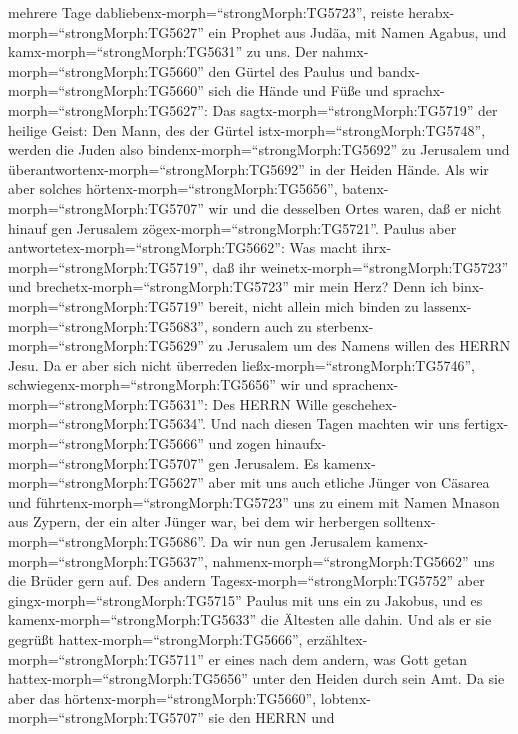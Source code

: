 mehrere Tage dabliebenx-morph=``strongMorph:TG5723'', reiste
herabx-morph=``strongMorph:TG5627'' ein Prophet aus Judäa, mit Namen
Agabus, und kamx-morph=``strongMorph:TG5631'' zu uns.  Der
nahmx-morph=``strongMorph:TG5660'' den Gürtel des Paulus und
bandx-morph=``strongMorph:TG5660'' sich die Hände und Füße und
sprachx-morph=``strongMorph:TG5627'': Das
sagtx-morph=``strongMorph:TG5719'' der heilige Geist: Den Mann, des der
Gürtel istx-morph=``strongMorph:TG5748'', werden die Juden also
bindenx-morph=``strongMorph:TG5692'' zu Jerusalem und
überantwortenx-morph=``strongMorph:TG5692'' in der Heiden Hände.
 Als wir aber solches hörtenx-morph=``strongMorph:TG5656'',
batenx-morph=``strongMorph:TG5707'' wir und die desselben Ortes waren,
daß er nicht hinauf gen Jerusalem zögex-morph=``strongMorph:TG5721''.
 Paulus aber antwortetex-morph=``strongMorph:TG5662'': Was
macht ihrx-morph=``strongMorph:TG5719'', daß ihr
weinetx-morph=``strongMorph:TG5723'' und
brechetx-morph=``strongMorph:TG5723'' mir mein Herz? Denn ich
binx-morph=``strongMorph:TG5719'' bereit, nicht allein mich binden zu
lassenx-morph=``strongMorph:TG5683'', sondern auch zu
sterbenx-morph=``strongMorph:TG5629'' zu Jerusalem um des Namens willen
des HERRN Jesu.  Da er aber sich nicht überreden
ließx-morph=``strongMorph:TG5746'',
schwiegenx-morph=``strongMorph:TG5656'' wir und
sprachenx-morph=``strongMorph:TG5631'': Des HERRN Wille
geschehex-morph=``strongMorph:TG5634''.  Und nach diesen
Tagen machten wir uns fertigx-morph=``strongMorph:TG5666'' und zogen
hinaufx-morph=``strongMorph:TG5707'' gen Jerusalem.  Es
kamenx-morph=``strongMorph:TG5627'' aber mit uns auch etliche Jünger von
Cäsarea und führtenx-morph=``strongMorph:TG5723'' uns zu einem mit Namen
Mnason aus Zypern, der ein alter Jünger war, bei dem wir herbergen
solltenx-morph=``strongMorph:TG5686''.  Da wir nun gen
Jerusalem kamenx-morph=``strongMorph:TG5637'',
nahmenx-morph=``strongMorph:TG5662'' uns die Brüder gern auf.
 Des andern Tagesx-morph=``strongMorph:TG5752'' aber
gingx-morph=``strongMorph:TG5715'' Paulus mit uns ein zu Jakobus, und es
kamenx-morph=``strongMorph:TG5633'' die Ältesten alle dahin.
 Und als er sie gegrüßt
hattex-morph=``strongMorph:TG5666'',
erzähltex-morph=``strongMorph:TG5711'' er eines nach dem andern, was
Gott getan hattex-morph=``strongMorph:TG5656'' unter den Heiden durch
sein Amt.  Da sie aber das
hörtenx-morph=``strongMorph:TG5660'',
lobtenx-morph=``strongMorph:TG5707'' sie den HERRN und
